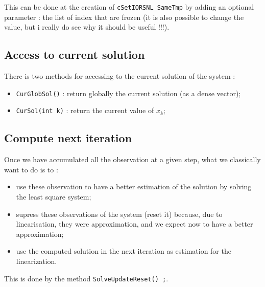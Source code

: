 This can be done at the creation of {\tt cSetIORSNL\_SameTmp} by adding an optional parameter :
the list of index that are frozen (it is also possible to change the value, but i really do see
why it should be useful !!!).


\subsection{Access to current solution}

There is two methods for accessing to the current solution of the system :

\begin{itemize}
       \item {\tt CurGlobSol()} : return globally the current solution (as a dense vector);

       \item {\tt CurSol(int k)} : return  the current value of $x_k$;

\end{itemize}


\subsection{Compute next iteration}

Once we have accumulated all the observation at a given step, what we classically
want to do is to :

\begin{itemize}
       \item use these observation  to have a better estimation of the solution by solving
             the least square system;

       \item supress  these observations of the system (reset it) because, due to linearisation,
             they were approximation, and we expect now to have a better approximation;

       \item use the computed solution in the next iteration as estimation for the linearization.
\end{itemize}

This is done by the method {\tt SolveUpdateReset() ;}.


